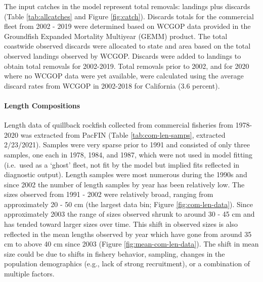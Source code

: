 \documentclass[11pt,
  english,
  a4paper,
]{article}
\begin{document}
\leavevmode\tagmcend\tagstructend\par


The input catches in the model represent total removals: landings plus discards (Table \ref{tab:allcatches} and Figure \ref{fig:catch}). Discards totals for the commercial fleet from 2002 - 2019 were determined based on WCGOP data provided in the Groundfish Expanded Mortality Multiyear (GEMM) product. The total coastwide observed discards were allocated to state and area based on the total observed landings observed by WCGOP. Discards were added to landings to obtain total removals for 2002-2019. Total removals prior to 2002, and for 2020 where no WCGOP data were yet available, were calculated using the average discard rates from WCGOP in 2002-2018 for California (3.6 percent).

\leavevmode\tagmcend\tagstructend\par


\hypertarget{length-compositions}{%
\paragraph{Length Compositions}\label{length-compositions}}

\leavevmode\tagmcend\tagstructend


Length data of quillback rockfish collected from commercial fisheries from 1978-2020 was extracted from PacFIN (Table \ref{tab:com-len-samps}, extracted 2/23/2021). Samples were very sparse prior to 1991 and consisted of only three samples, one each in 1978, 1984, and 1987, which were not used in model fitting (i.e.~used as a `ghost' fleet, not fit by the model but implied fits reflected in diagnostic output). Length samples were most numerous during the 1990s and since 2002 the number of length samples by year has been relatively low. The sizes observed from 1991 - 2002 were relatively broad, ranging from approximately 20 - 50 cm (the largest data bin; Figure \ref{fig:com-len-data}). Since approximately 2003 the range of sizes observed shrunk to around 30 - 45 cm and has tended toward larger sizes over time. This shift in observed sizes is also reflected in the mean lengths observed by year which have gone from around 35 cm to above 40 cm since 2003 (Figure \ref{fig:mean-com-len-data}). The shift in mean size could be due to shifts in fishery behavior, sampling, changes in the population demographics (e.g., lack of strong recruitment), or a combination of multiple factors.
\end{document}
